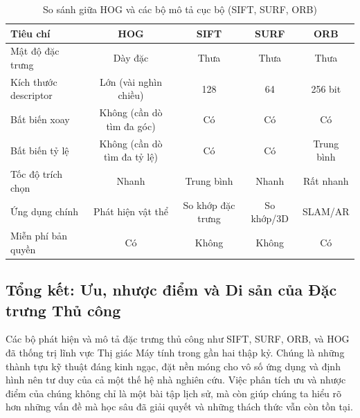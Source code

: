 \begin{table}[H]
	\centering
	\caption{So sánh giữa HOG và các bộ mô tả cục bộ (SIFT, SURF, ORB)}
	\begin{tabular}{lcccc}
		\toprule
		\textbf{Tiêu chí} & \textbf{HOG} & \textbf{SIFT} & \textbf{SURF} & \textbf{ORB} \\
		\midrule
		Mật độ đặc trưng & Dày đặc & Thưa & Thưa & Thưa \\
		Kích thước descriptor & Lớn (vài nghìn chiều) & 128 & 64 & 256 bit \\
		Bất biến xoay & Không (cần dò tìm đa góc) & Có & Có & Có \\
		Bất biến tỷ lệ & Không (cần dò tìm đa tỷ lệ) & Có & Có & Trung bình \\
		Tốc độ trích chọn & Nhanh & Trung bình & Nhanh & Rất nhanh \\
		Ứng dụng chính & Phát hiện vật thể & So khớp đặc trưng & So khớp/3D & SLAM/AR \\
		Miễn phí bản quyền & Có & Không & Không & Có \\
		\bottomrule
	\end{tabular}
\end{table}

\subsection{Tổng kết: Ưu, nhược điểm và Di sản của Đặc trưng Thủ công}
\label{subsec:handcrafted_pros_cons}

Các bộ phát hiện và mô tả đặc trưng thủ công như SIFT, SURF, ORB, và HOG đã thống trị lĩnh vực Thị giác Máy tính trong gần hai thập kỷ. Chúng là những thành tựu kỹ thuật đáng kinh ngạc, đặt nền móng cho vô số ứng dụng và định hình nên tư duy của cả một thế hệ nhà nghiên cứu. Việc phân tích ưu và nhược điểm của chúng không chỉ là một bài tập lịch sử, mà còn giúp chúng ta hiểu rõ hơn những vấn đề mà học sâu đã giải quyết và những thách thức vẫn còn tồn tại.

